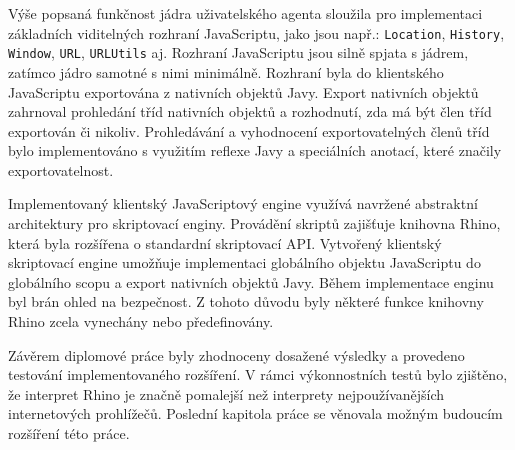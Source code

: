 Výše popsaná funkčnost jádra uživatelského agenta sloužila pro implementaci základních viditelných rozhraní JavaScriptu, jako jsou např.: \texttt{Location}, \texttt{History}, \texttt{Window}, \texttt{URL}, \texttt{URLUtils} aj. Rozhraní JavaScriptu jsou silně spjata s jádrem, zatímco jádro samotné s nimi minimálně. Rozhraní byla do klientského JavaScriptu exportována z nativních objektů Javy. Export nativních objektů zahrnoval prohledání tříd nativních objektů a rozhodnutí, zda má být člen tříd exportován či nikoliv. Prohledávání a vyhodnocení exportovatelných členů tříd bylo implementováno s využitím reflexe Javy a speciálních anotací, které značily exportovatelnost.

Implementovaný klientský JavaScriptový engine využívá navržené abstraktní architektury pro skriptovací enginy. Provádění skriptů zajišťuje knihovna Rhino, která byla rozšířena o standardní skriptovací API. Vytvořený klientský skriptovací engine umožňuje implementaci globálního objektu JavaScriptu do globálního scopu a export nativních objektů Javy. Během implementace enginu byl brán ohled na bezpečnost. Z tohoto důvodu byly některé funkce knihovny Rhino zcela vynechány nebo předefinovány.

Závěrem diplomové práce byly zhodnoceny dosažené výsledky a provedeno testování implementovaného rozšíření. V rámci výkonnostních testů bylo zjištěno, že interpret Rhino je značně pomalejší než interprety nejpoužívanějších internetových prohlížečů. Poslední kapitola práce se věnovala možným budoucím rozšíření této práce.
